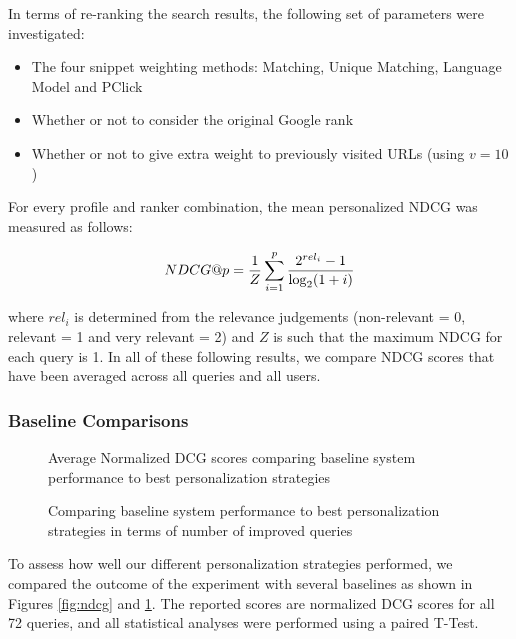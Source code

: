 \documentclass{sig-alternate}
\begin{document}
In terms of re-ranking the search results, the following set of parameters were investigated: 

\begin{itemize}
\item The four snippet weighting methods: Matching, Unique Matching, Language Model and PClick
\item Whether or not to consider the original Google rank
\item Whether or not to give extra weight to previously visited URLs (using $v=10$)
\end{itemize}

For every profile and ranker combination, the mean personalized NDCG was measured as follows:

\begin{equation}
NDCG@p = {1 \over Z} \sum_{i = 1}^{p} \frac{2^{rel_i} - 1}{\log_2(1 + i)}
\label{eqn:ndcg}
\end{equation}

where $rel_i$ is determined from the relevance judgements (non-relevant = 0, relevant = 1 and very relevant = 2) and $Z$ is such that the maximum NDCG for each query is 1. In all of these following results, we compare NDCG scores that have been averaged across all queries and all users.

\subsubsection{Baseline Comparisons}

\begin{figure}
\centering
{}
\caption{Average Normalized DCG scores comparing baseline system performance to best personalization strategies}
\label{fig:ndcg}

\centering
{}
\caption{Comparing baseline system performance to best personalization strategies in terms of number of improved queries}
\label{fig:queries}
\end{figure}

To assess how well our different personalization strategies performed, we compared the outcome of the experiment with several baselines as shown in Figures \ref{fig:ndcg} and \ref{fig:queries}. The reported scores are normalized DCG scores for all 72 queries, and all statistical analyses were performed using a paired T-Test.

\end{document}
